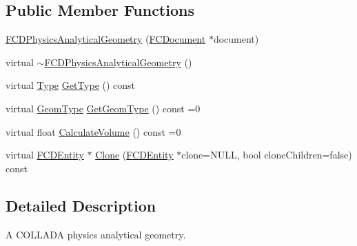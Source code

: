 \subsection*{Public Member Functions}
\begin{DoxyCompactItemize}
\item 
\hyperlink{classFCDPhysicsAnalyticalGeometry_a3e92c7528dfeb9909ef2e90dd4888c76}{FCDPhysicsAnalyticalGeometry} (\hyperlink{classFCDocument}{FCDocument} $\ast$document)
\item 
virtual \hyperlink{classFCDPhysicsAnalyticalGeometry_a50f1ab64cc863c3361528c6cc9931688}{$\sim$FCDPhysicsAnalyticalGeometry} ()
\item 
virtual \hyperlink{classFCDEntity_a9301a4bd5f4d4190ec13e40db4effdd7}{Type} \hyperlink{classFCDPhysicsAnalyticalGeometry_a9a228510e74aafa38f32d60b01b2cb69}{GetType} () const 
\item 
virtual \hyperlink{classFCDPhysicsAnalyticalGeometry_a511583406e5c6a1bb5bd84c0453a452c}{GeomType} \hyperlink{classFCDPhysicsAnalyticalGeometry_a1902e92f195b227e7bee8799060e3084}{GetGeomType} () const =0
\item 
virtual float \hyperlink{classFCDPhysicsAnalyticalGeometry_aaf2af0d36280492051e8033ab8dc3ef9}{CalculateVolume} () const =0
\item 
virtual \hyperlink{classFCDEntity}{FCDEntity} $\ast$ \hyperlink{classFCDPhysicsAnalyticalGeometry_a804b67f4fccd71a46dd182b3ece13e39}{Clone} (\hyperlink{classFCDEntity}{FCDEntity} $\ast$clone=NULL, bool cloneChildren=false) const 
\end{DoxyCompactItemize}


\subsection{Detailed Description}
A COLLADA physics analytical geometry. 

